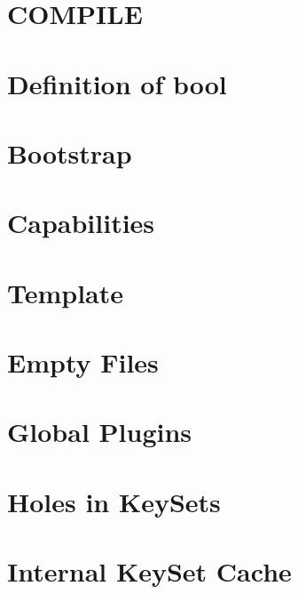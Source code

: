 \documentclass[twoside]{book}
\newcommand{\+}{\discretionary{\mbox{\scriptsize$\hookleftarrow$}}{}{}}
\begin{document}
\chapter{C\+O\+M\+P\+I\+L\+E}
\label{doc_COMPILE_md}
\hypertarget{doc_COMPILE_md}{}

\chapter{Definition of bool}
\label{doc_decisions_bool_md}
\hypertarget{doc_decisions_bool_md}{}

\chapter{Bootstrap}
\label{doc_decisions_bootstrap_md}
\hypertarget{doc_decisions_bootstrap_md}{}

\chapter{Capabilities}
\label{doc_decisions_capabilities_md}
\hypertarget{doc_decisions_capabilities_md}{}

\chapter{Template}
\label{doc_decisions_cmake_spec_md}
\hypertarget{doc_decisions_cmake_spec_md}{}

\chapter{Empty Files}
\label{doc_decisions_empty_files_md}
\hypertarget{doc_decisions_empty_files_md}{}

\chapter{Global Plugins}
\label{doc_decisions_global_plugins_md}
\hypertarget{doc_decisions_global_plugins_md}{}

\chapter{Holes in Key\+Sets}
\label{doc_decisions_holes_md}
\hypertarget{doc_decisions_holes_md}{}

\chapter{Internal Key\+Set Cache}
\label{doc_decisions_internal_cache_md}
\hypertarget{doc_decisions_internal_cache_md}{}

\end{document}
